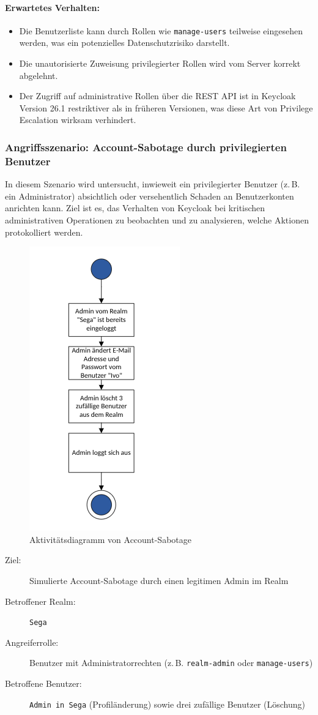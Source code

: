 \documentclass[a4paper,12pt]{article}
\begin{document}
	\paragraph{Erwartetes Verhalten:}
	\begin{itemize}
		\item Die Benutzerliste kann durch Rollen wie \texttt{manage-users} teilweise eingesehen werden, was ein potenzielles Datenschutzrisiko darstellt.
		\item Die unautorisierte Zuweisung privilegierter Rollen wird vom Server korrekt abgelehnt.
		\item Der Zugriff auf administrative Rollen über die REST API ist in Keycloak Version 26.1 restriktiver als in früheren Versionen, was diese Art von Privilege Escalation wirksam verhindert.
	\end{itemize}


	\subsubsection{Angriffsszenario: Account-Sabotage durch privilegierten Benutzer}
	In diesem Szenario wird untersucht, inwieweit ein privilegierter Benutzer (z.\,B. ein Administrator) absichtlich oder versehentlich Schaden an Benutzerkonten anrichten kann. Ziel ist es, das Verhalten von Keycloak bei kritischen administrativen Operationen zu beobachten und zu analysieren, welche Aktionen protokolliert werden.
	
	\begin{figure}
		\centering
		\includegraphics[width=0.3\linewidth]{Bilder/angriff_2}
		\caption{Aktivitätsdiagramm von Account-Sabotage}
		\label{fig:angriff2}
	\end{figure}
	
	\begin{description}
		\item[Ziel:] Simulierte Account-Sabotage durch einen legitimen Admin im Realm
		\item[Betroffener Realm:] \texttt{Sega}
		\item[Angreiferrolle:] Benutzer mit Administratorrechten (z.\,B. \texttt{realm-admin} oder \texttt{manage-users})
		\item[Betroffene Benutzer:] \texttt{Admin in Sega} (Profiländerung) sowie drei zufällige Benutzer (Löschung)
	\end{description}
	
\end{document}
